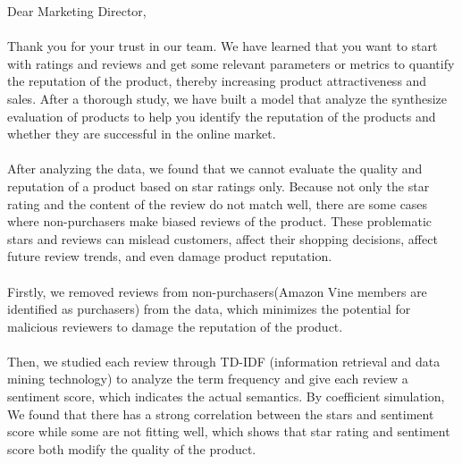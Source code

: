 \documentclass{mcmthesis}
\begin{document}
\begin{memo}[Letter]
Dear Marketing Director,
\\\\
Thank you for your trust in our team. We have learned that you want to start with ratings and reviews and get some relevant parameters or metrics to quantify the reputation of the product, thereby increasing product attractiveness and sales. After a thorough study, we have built a model that analyze the synthesize evaluation of products to help you identify the reputation of the products and whether they are successful in the online market.
\\\\
After analyzing the data, we found that we cannot evaluate the quality and reputation of a product based on star ratings only. Because not only the star rating and the content of the review do not match well, there are some cases where non-purchasers make biased reviews of the product. These problematic stars and reviews can mislead customers, affect their shopping decisions, affect future review trends, and even damage product reputation.
\\\\
Firstly, we removed reviews from non-purchasers(Amazon Vine members are identified as purchasers) from the data, which minimizes the potential for malicious reviewers to damage the reputation of the product. 
\\\\
Then, we studied each review through TD-IDF (information retrieval and data mining technology) to analyze the term frequency and give each review a sentiment score, which indicates the actual semantics. By coefficient simulation, We found that there has a strong correlation between the stars and sentiment score while some are not fitting well, which shows that star rating and sentiment score both modify the quality of the product.
\\\\

\end{memo}
\end{document}
